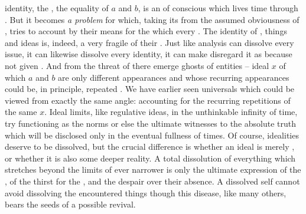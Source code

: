 \label{th:idcont}

 identity, the , the equality of $a$
and $b$, is an  of conscious  which lives time through
. But it becomes {\em a problem} for  which,
taking its  from the assumed obviousness of , tries
to account by their means for the  which  every
. The identity of , things and ideas is, indeed, a
very fragile  of their .  Just like analysis can
dissolve every issue, it can likewise dissolve every identity, it can make
 disregard it as  because not given .
And from the threat of  there emerge ghosts of 
entities -- ideal $x$ of which $a$ and $b$ are only different appearances and
whose recurring appearances could be, in principle, repeated .
We have earlier seen universals which could be viewed from exactly the
same angle: accounting for the recurring repetitions of the same $x$. Ideal
limits, like regulative ideas,  in the unthinkable infinity of time,
try functioning as the norms or else the ultimate witnesses to the absolute
truth which will be disclosed only in the eventual fullness of times. Of course,
idealities deserve to be dissolved, but the crucial difference is whether an
ideal is merely , or whether it is also  some deeper
reality.  A total dissolution of everything which stretches beyond the limits of
ever narrower  is only the ultimate expression of the
, of the thirst for the , and the despair
over their absence. A dissolved self cannot avoid dissolving the encountered
things though this disease, like many others, bears the seeds of a possible
revival.


